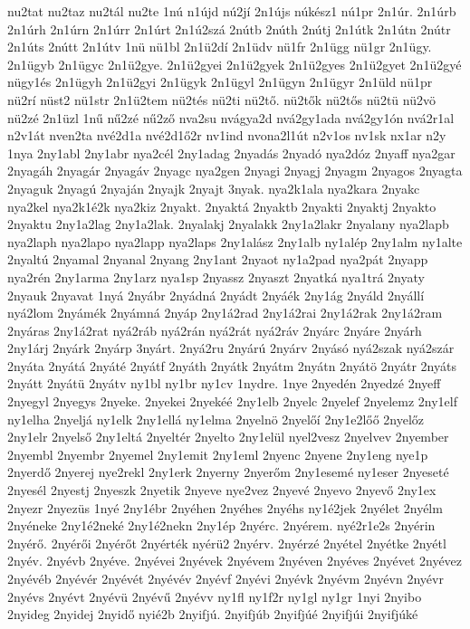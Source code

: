 {nu2tat
nu2taz
nu2tál
nu2te
1nú
n1újd
nú2jí
2n1újs
núkész1
nú1pr
2n1úr.
2n1úrb
2n1úrh
2n1úrn
2n1úrr
2n1úrt
2n1ú2szá
2nútb
2núth
2nútj
2n1útk
2n1útn
2nútr
2n1úts
2nútt
2n1útv
1nü
nü1bl
2n1ü2dí
2n1üdv
nü1fr
2n1ügg
nü1gr
2n1ügy.
2n1ügyb
2n1ügyc
2n1ü2gye.
2n1ü2gyei
2n1ü2gyek
2n1ü2gyes
2n1ü2gyet
2n1ü2gyé
nügy1és
2n1ügyh
2n1ü2gyi
2n1ügyk
2n1ügyl
2n1ügyn
2n1ügyr
2n1üld
nü1pr
nü2rí
nüst2
nü1str
2n1ü2tem
nü2tés
nü2ti
nü2tő.
nü2tők
nü2tős
nü2tü
nü2vö
nü2zé
2n1üzl
1nű
nű2zé
nű2ző
nva2su
nvágya2d
nvá2gy1ada
nvá2gy1ón
nvá2r1al
n2v1át
nven2ta
nvé2d1a
nvé2d1ő2r
nv1ind
nvona2l1út
n2v1os
nv1sk
nx1ar
n2y
1nya
2ny1abl
2ny1abr
nya2cél
2ny1adag
2nyadás
2nyadó
nya2dóz
2nyaff
nya2gar
2nyagáh
2nyagár
2nyagáv
2nyagc
nya2gen
2nyagi
2nyagj
2nyagm
2nyagos
2nyagta
2nyaguk
2nyagú
2nyaján
2nyajk
2nyajt
3nyak.
nya2k1ala
nya2kara
2nyakc
nya2kel
nya2k1é2k
nya2kiz
2nyakt.
2nyaktá
2nyaktb
2nyakti
2nyaktj
2nyakto
2nyaktu
2ny1a2lag
2ny1a2lak.
2nyalakj
2nyalakk
2ny1a2lakr
2nyalany
nya2lapb
nya2laph
nya2lapo
nya2lapp
nya2laps
2ny1alász
2ny1alb
ny1alép
2ny1alm
ny1alte
2nyaltú
2nyamal
2nyanal
2nyang
2ny1ant
2nyaot
ny1a2pad
nya2pát
2nyapp
nya2rén
2ny1arma
2ny1arz
nya1sp
2nyassz
2nyaszt
2nyatká
nya1trá
2nyaty
2nyauk
2nyavat
1nyá
2nyábr
2nyádná
2nyádt
2nyáék
2ny1ág
2nyáld
2nyállí
nyá2lom
2nyámék
2nyámná
2nyáp
2ny1á2rad
2ny1á2rai
2ny1á2rak
2ny1á2ram
2nyáras
2ny1á2rat
nyá2ráb
nyá2rán
nyá2rát
nyá2ráv
2nyárc
2nyáre
2nyárh
2ny1árj
2nyárk
2nyárp
3nyárt.
2nyá2ru
2nyárú
2nyárv
2nyásó
nyá2szak
nyá2szár
2nyáta
2nyátá
2nyáté
2nyátf
2nyáth
2nyátk
2nyátm
2nyátn
2nyátö
2nyátr
2nyáts
2nyátt
2nyátü
2nyátv
ny1bl
ny1br
ny1cv
1nydre.
1nye
2nyedén
2nyedzé
2nyeff
2nyegyl
2nyegys
2nyeke.
2nyekei
2nyekéé
2ny1elb
2nyelc
2nyelef
2nyelemz
2ny1elf
ny1elha
2nyeljá
ny1elk
2ny1ellá
ny1elma
2nyelnö
2nyelőí
2ny1e2lőő
2nyelőz
2ny1elr
2nyelső
2ny1eltá
2nyeltér
2nyelto
2ny1elül
nyel2vesz
2nyelvev
2nyember
2nyembl
2nyembr
2nyemel
2ny1emit
2ny1eml
2nyenc
2nyene
2ny1eng
nye1p
2nyerdő
2nyerej
nye2rekl
2ny1erk
2nyerny
2nyerőm
2ny1esemé
ny1eser
2nyeseté
2nyesél
2nyestj
2nyeszk
2nyetik
2nyeve
nye2vez
2nyevé
2nyevo
2nyevő
2ny1ex
2nyezr
2nyezüs
1nyé
2ny1ébr
2nyéhen
2nyéhes
2nyéhs
ny1é2jek
2nyélet
2nyélm
2nyéneke
2ny1é2neké
2ny1é2nekn
2ny1ép
2nyérc.
2nyérem.
nyé2r1e2s
2nyérin
2nyérő.
2nyérői
2nyérőt
2nyérték
nyérü2
2nyérv.
2nyérzé
2nyétel
2nyétke
2nyétl
2nyév.
2nyévb
2nyéve.
2nyévei
2nyévek
2nyévem
2nyéven
2nyéves
2nyévet
2nyévez
2nyévéb
2nyévér
2nyévét
2nyévév
2nyévf
2nyévi
2nyévk
2nyévm
2nyévn
2nyévr
2nyévs
2nyévt
2nyévü
2nyévű
2nyévv
ny1fl
ny1f2r
ny1gl
ny1gr
1nyi
2nyibo
2nyideg
2nyidej
2nyidő
nyié2b
2nyifjú.
2nyifjúb
2nyifjúé
2nyifjúi
2nyifjúké
}
